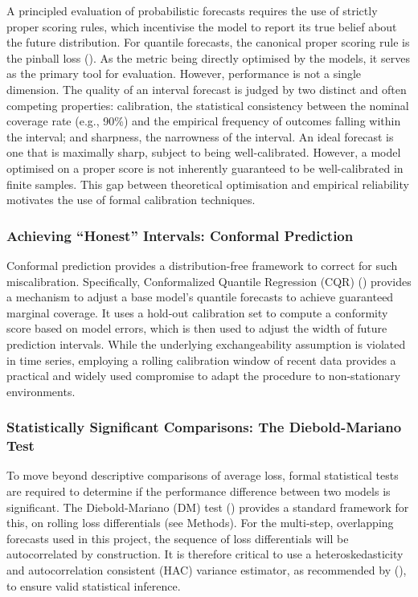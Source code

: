 \documentclass[
  a4paper,
  DIV=11,
  numbers=noendperiod]{scrreprt}
\begin{document}
A principled evaluation of probabilistic forecasts requires the use of
strictly proper scoring rules, which incentivise the model to report its
true belief about the future distribution. For quantile forecasts, the
canonical proper scoring rule is the pinball loss
(). As the metric
being directly optimised by the models, it serves as the primary tool
for evaluation. However, performance is not a single dimension. The
quality of an interval forecast is judged by two distinct and often
competing properties: calibration, the statistical consistency between
the nominal coverage rate (e.g., 90\%) and the empirical frequency of
outcomes falling within the interval; and sharpness, the narrowness of
the interval. An ideal forecast is one that is maximally sharp, subject
to being well-calibrated. However, a model optimised on a proper score
is not inherently guaranteed to be well-calibrated in finite samples.
This gap between theoretical optimisation and empirical reliability
motivates the use of formal calibration techniques.

\subsubsection{Achieving ``Honest'' Intervals: Conformal
Prediction}\label{achieving-honest-intervals-conformal-prediction}

Conformal prediction provides a distribution-free framework to correct
for such miscalibration. Specifically, Conformalized Quantile Regression
(CQR) ()
provides a mechanism to adjust a base model's quantile forecasts to
achieve guaranteed marginal coverage. It uses a hold-out calibration set
to compute a conformity score based on model errors, which is then used
to adjust the width of future prediction intervals. While the underlying
exchangeability assumption is violated in time series, employing a
rolling calibration window of recent data provides a practical and
widely used compromise to adapt the procedure to non-stationary
environments.

\subsubsection{Statistically Significant Comparisons: The
Diebold-Mariano
Test}\label{statistically-significant-comparisons-the-diebold-mariano-test}

To move beyond descriptive comparisons of average loss, formal
statistical tests are required to determine if the performance
difference between two models is significant. The Diebold-Mariano (DM)
test () provides a
standard framework for this, on rolling loss differentials (see
Methods). For the multi-step, overlapping forecasts used in this
project, the sequence of loss differentials will be autocorrelated by
construction. It is therefore critical to use a heteroskedasticity and
autocorrelation consistent (HAC) variance estimator, as recommended by
(), to ensure valid statistical
inference.
\end{document}
